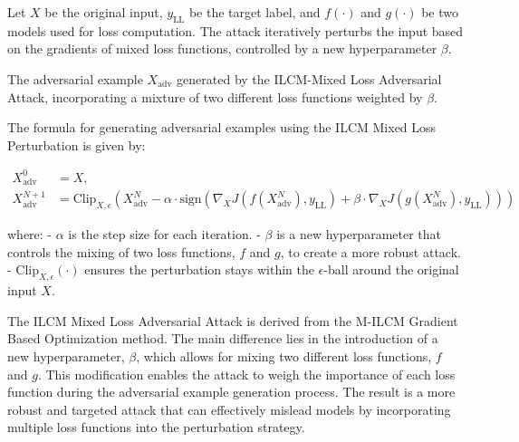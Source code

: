 Let \( X \) be the original input, \( y_{\text{LL}} \) be the target label, and \( f(\cdot) \) and \( g(\cdot) \) be two models used for loss computation. The attack iteratively perturbs the input based on the gradients of mixed loss functions, controlled by a new hyperparameter \( \beta \).


The adversarial example \( X_{\text{adv}} \) generated by the ILCM-Mixed Loss Adversarial Attack, incorporating a mixture of two different loss functions weighted by \( \beta \).


The formula for generating adversarial examples using the ILCM Mixed Loss Perturbation is given by:

\begin{align}
X_{\text{adv}}^0 &= X, \\
X_{\text{adv}}^{N+1} &= \text{Clip}_{X,\epsilon} \left( X_{\text{adv}}^N - \alpha \cdot \text{sign} \left( \nabla_X J(f(X_{\text{adv}}^N), y_{\text{LL}}) + \beta \cdot \nabla_X J(g(X_{\text{adv}}^N), y_{\text{LL}}) \right) \right)
\end{align}

where:
- $\alpha$ is the step size for each iteration.
- $\beta$ is a new hyperparameter that controls the mixing of two loss functions, $f$ and $g$, to create a more robust attack.
- $\text{Clip}_{X,\epsilon}(\cdot)$ ensures the perturbation stays within the $\epsilon$-ball around the original input $X$.

The ILCM Mixed Loss Adversarial Attack is derived from the M-ILCM Gradient Based Optimization method. The main difference lies in the introduction of a new hyperparameter, $\beta$, which allows for mixing two different loss functions, $f$ and $g$. This modification enables the attack to weigh the importance of each loss function during the adversarial example generation process. The result is a more robust and targeted attack that can effectively mislead models by incorporating multiple loss functions into the perturbation strategy.